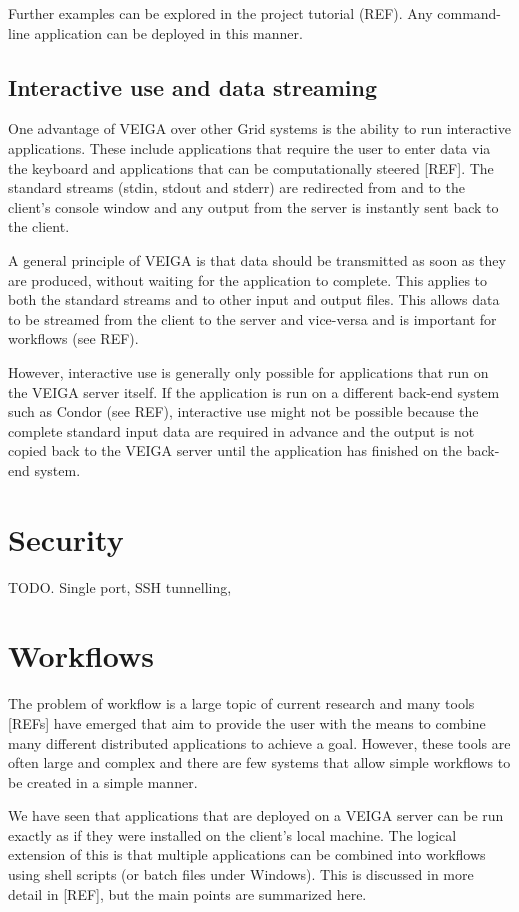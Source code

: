 \documentclass[a4paper]{article}
\begin{document}
\begin{multicols}{2}
Further examples can be explored in the project tutorial (REF).  Any command-line application can be deployed in this manner.

\subsection{Interactive use and data streaming}\label{sec:interactive}
One advantage of VEIGA over other Grid systems is the ability to run interactive applications.  These include applications that require the user to enter data via the keyboard and applications that can be computationally steered [REF].  The standard streams (stdin, stdout and stderr) are redirected from and to the client's console window and any output from the server is instantly sent back to the client.

A general principle of VEIGA is that data should be transmitted as soon as they are produced, without waiting for the application to complete.  This applies to both the standard streams and to other input and output files.  This allows data to be streamed from the client to the server and vice-versa and is important for workflows (see REF).

However, interactive use is generally only possible for applications that run on the VEIGA server itself.  If the application is run on a different back-end system such as Condor (see REF), interactive use might not be possible because the complete standard input data are required in advance and the output is not copied back to the VEIGA server until the application has finished on the back-end system.

\section{Security}
TODO.  Single port, SSH tunnelling, 

\section{Workflows}\label{sec:workflows}
The problem of workflow is a large topic of current research and many tools [REFs] have emerged that aim to provide the user with the means to combine many different distributed applications to achieve a goal.  However, these tools are often large and complex and there are few systems that allow simple workflows to be created in a simple manner.

We have seen that applications that are deployed on a VEIGA server can be run exactly as if they were installed on the client's local machine.  The logical extension of this is that multiple applications can be combined into workflows using shell scripts (or batch files under Windows).  This is discussed in more detail in [REF], but the main points are summarized here.


\end{multicols}
\end{document}
